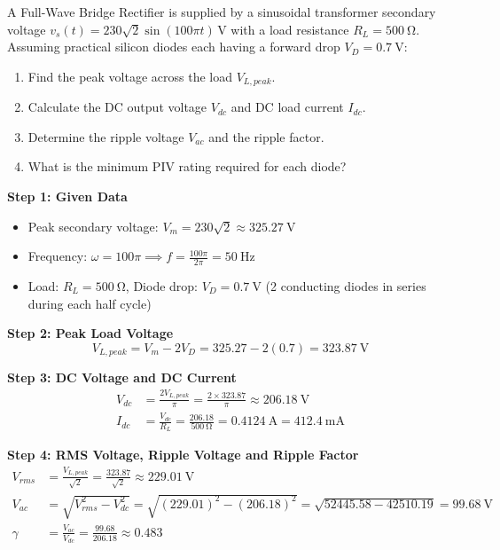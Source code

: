 \begin{example}
A Full-Wave Bridge Rectifier is supplied by a sinusoidal transformer secondary voltage $v_s(t) = 230\sqrt{2}\sin(100\pi t)\,\si{\volt}$ with a load resistance $R_L = \SI{500}{\ohm}$. Assuming practical silicon diodes each having a forward drop $V_D = \SI{0.7}{\volt}$:
\begin{enumerate}
    \item Find the peak voltage across the load $V_{L,peak}$.
    \item Calculate the DC output voltage $V_{dc}$ and DC load current $I_{dc}$.
    \item Determine the ripple voltage $V_{ac}$ and the ripple factor.
    \item What is the minimum PIV rating required for each diode?
\end{enumerate}

\tcblower
\textbf{Step 1: Given Data}
\begin{itemize}
    \item Peak secondary voltage: $V_m = 230\sqrt{2} \approx \SI{325.27}{\volt}$
    \item Frequency: $\omega = 100\pi \implies f = \frac{100\pi}{2\pi} = \SI{50}{\hertz}$
    \item Load: $R_L = \SI{500}{\ohm}$, Diode drop: $V_D = \SI{0.7}{\volt}$ (2 conducting diodes in series during each half cycle)
\end{itemize}

\textbf{Step 2: Peak Load Voltage}
\begin{equation*}
    V_{L,peak} = V_m - 2V_D = 325.27 - 2(0.7) = \SI{323.87}{\volt}
\end{equation*}

\textbf{Step 3: DC Voltage and DC Current}
\begin{align*}
    V_{dc} &= \frac{2 V_{L,peak}}{\pi} = \frac{2 \times 323.87}{\pi} \approx \SI{206.18}{\volt} \\
    I_{dc} &= \frac{V_{dc}}{R_L} = \frac{206.18}{\SI{500}{\ohm}} = \SI{0.4124}{\ampere} = \SI{412.4}{\milli\ampere}
\end{align*}

\textbf{Step 4: RMS Voltage, Ripple Voltage and Ripple Factor}
\begin{align*}
    V_{rms} &= \frac{V_{L,peak}}{\sqrt{2}} = \frac{323.87}{\sqrt{2}} \approx \SI{229.01}{\volt} \\
    V_{ac} &= \sqrt{V_{rms}^2 - V_{dc}^2} = \sqrt{(229.01)^2 - (206.18)^2} = \sqrt{52445.58 - 42510.19} = \SI{99.68}{\volt} \\
    \gamma &= \frac{V_{ac}}{V_{dc}} = \frac{99.68}{206.18} \approx 0.483
\end{align*}


\end{example}
